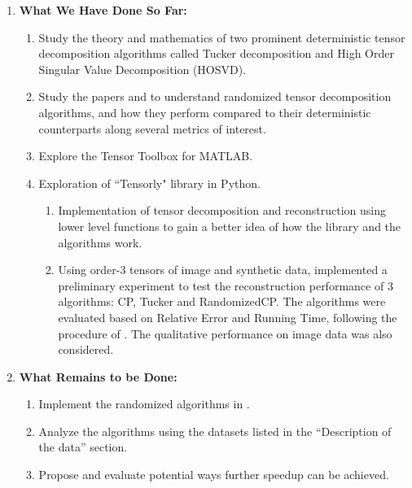 \documentclass[12pt,a4paper]{article}
\begin{document}
\begin{enumerate}
    
    \item \textbf{What We Have Done So Far:}
    \begin{enumerate}
        \item Study the theory and mathematics of two prominent deterministic tensor decomposition algorithms called Tucker decomposition and High Order
        Singular Value Decomposition (HOSVD).
        \item Study the papers \cite{9350569} and \cite{Kolda2009} to understand randomized tensor decomposition algorithms, and how they perform compared to their deterministic counterparts along several metrics of interest.
        \item Explore the Tensor Toolbox for MATLAB.
        \item Exploration of ``Tensorly" \cite{tensorly} library in Python.
        \begin{enumerate}
            \item Implementation of tensor decomposition and reconstruction using lower level functions to gain a better idea of how the library and the algorithms work.
            \item Using order-3 tensors of image and synthetic data, implemented a preliminary experiment to test the reconstruction performance of 3 algorithms: CP, Tucker and RandomizedCP. The algorithms were evaluated based on Relative Error and Running Time, following the procedure of \cite{9350569}. The qualitative performance on image data was also considered. 
        \end{enumerate}
        
    \end{enumerate}
    
    \item \textbf{What Remains to be Done:}
    \begin{enumerate}
        \item Implement the randomized algorithms in \cite{9350569}.
        \item Analyze the algorithms using the datasets listed in
        the ``Description of the data'' section.
        \item Propose and evaluate potential ways further speedup can be achieved.
    \end{enumerate}
    
\end{enumerate}


\end{document}
